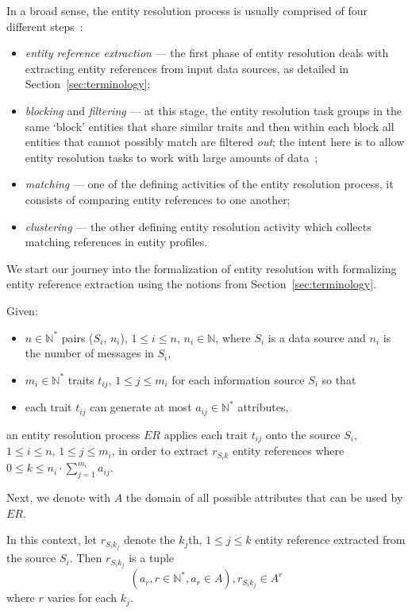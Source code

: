 In a broad sense, the entity resolution process is usually comprised of four
different steps~\cite{Pap19,Tal11}:

\begin{itemize}
    \item \textit{entity reference extraction} --- the first phase of entity
    resolution deals with extracting entity references from input data
    sources, as detailed in Section~\ref{sec:terminology};
    \item \textit{blocking} and \textit{filtering} --- at this stage, the
    entity resolution task groups in the same `block' entities that share
    similar traits and then within each block all entities that cannot
    possibly match are filtered \textit{out}; the intent here is to allow
    entity resolution tasks to work with large amounts of data~\cite{Pap19};
    \item \textit{matching} --- one of the defining activities of the entity
    resolution process, it consists of comparing entity references to one
    another;
    \item \textit{clustering} --- the other defining entity resolution
    activity which collects matching references in entity profiles.
\end{itemize}

We start our journey into the formalization of entity resolution with
formalizing entity reference extraction using the notions from
Section~\ref{sec:terminology}.

Given:
\begin{itemize}
    \item $n \in \mathbb{N}^*$ pairs ($S_i$, $n_i$), $1 \leq i \leq n$, $n_i \in \mathbb{N}$, 
    where $S_i$ is a data source and $n_i$ is the number of messages in
    $S_i$,
    \item $m_i \in \mathbb{N}^*$ traits $t_{ij}$, $1 \leq j \leq m_i$ for each
    information source $S_i$ so that
    \item each trait $t_{ij}$ can generate at most $a_{ij} \in \mathbb{N}^*$
    attributes,
\end{itemize}
an entity resolution process $ER$ applies each trait $t_{ij}$ onto the source
$S_i$, $1 \leq i \leq n$, $1 \leq j \leq m_i$, in order to extract
$r_{{S_i}k}$ entity references where
$0 \leq k \leq n_i \cdot \sum^{m_i}_{j=1}a_{ij}$.

Next, we denote with $A$ the domain of all possible attributes that can be
used by $ER$.

In this context, let $r_{{S_i}{k_j}}$ denote the $k_j$th, $1 \leq j \leq k$
entity reference extracted from the source $S_i$.
Then $r_{{S_i}{k_j}}$ is a tuple
\[
    (a_r, r \in \mathbb{N}^*, a_r \in A), r_{{S_i}{k_j}} \in A^r
\]
where $r$ varies for each $k_j$.


